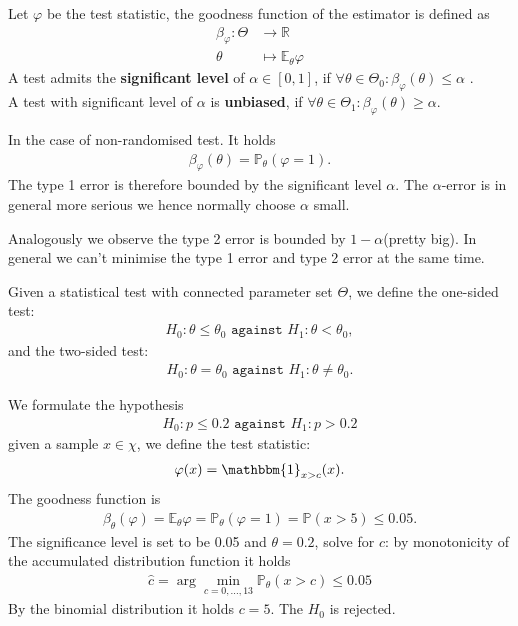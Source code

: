 \begin{definition}
	Let $\varphi$ be the test statistic, the goodness function of the estimator is defined as 
	\begin{align*}
		\beta_\varphi: \Theta &\rightarrow \mathbb{R}\\
		\theta &\mapsto \mathbb{E}_\theta \varphi
	\end{align*}
	A test admits the \textbf{significant level} of $\alpha \in [0,1]$, if $ \forall \theta \in \Theta_0:  \beta_\varphi(\theta) \le \alpha$ . \\
	A test with significant level of $\alpha$ is \textbf{unbiased}, if $\forall \theta \in \Theta_1: \beta_\varphi(\theta) \ge \alpha$.  
\end{definition}
\begin{remark}
In the case of non-randomised test. It holds
\begin{align*}
	\beta_\varphi(\theta) = \mathbb{P}_\theta (\varphi = 1). 
\end{align*}	
The type 1 error is therefore bounded by the significant level $\alpha$.
The $\alpha$-error is in general more serious we hence normally choose $\alpha$ small. \par 
Analogously we observe the type 2 error is bounded by $1-\alpha$(pretty big). In general we can't minimise the type 1 error and type 2 error at the same time. 
\end{remark}

\begin{definition}
Given a statistical test with connected parameter set $\Theta$, we define the one-sided test:
\begin{align*}
	H_0: \theta \le \theta_0 \texttt{ against } H_1: \theta < \theta_0,
\end{align*}
and the two-sided test:
\begin{align*}
	H_0: \theta = \theta_0 \texttt{ against }  H_1: \theta \neq \theta_0.
\end{align*}
\end{definition}

\begin{example}


We formulate the hypothesis
\begin{align*}
	H_0: p \le 0.2 \texttt{ against } H_1: p > 0.2
\end{align*}
given a sample $x \in \chi$, we define the test statistic:
\begin{align*}
	\varphi(x) = \mathbbm{1}_{x > c}(x). 
\end{align*}	
The goodness function is 
\begin{align*}
	\beta_\theta(\varphi) = \mathbb{E}_\theta \varphi = \mathbb{P}_\theta(\varphi = 1) = \mathbb{P}(x >5) \le 0.05.
\end{align*}
The significance level is set to be 0.05 and $\theta = 0.2$, solve for $c$: by monotonicity of the accumulated distribution function it holds
\begin{align*}
	 \hat{c} = \arg\min_{c = 0, \dots, 13} \mathbb{P}_\theta (x >  c) \le 0.05 
\end{align*}
By the binomial distribution it holds $c = 5$. The $H_0$ is rejected.
\end{example}


